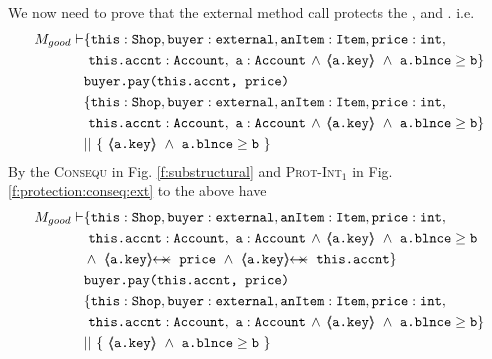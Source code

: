 \begin{proofO}
We now need to prove that the external method call  protects the , and . i.e.
\small
\begin{align*}
M_{good} \vdash 
		&\{  \prg{this}:\prg{Shop}, \prg{buyer} : \prg{external}, 
		\prg{anItem} : \prg{Item}, \prg{price} : \prg{int}, \\
		& \ \prg{this.accnt} : \prg{Account},\  \prg{a}:\prg{Account}\, \wedge\, {\inside{\prg{a.key}}}\ \wedge\ {\prg{a.blnce} \geq \prg{b}}\} \\
		  		& \prg{buyer.pay(this.accnt, price)}\ \\  
		&\{  \prg{this}:\prg{Shop}, \prg{buyer} : \prg{external}, 
		\prg{anItem} : \prg{Item}, \prg{price} : \prg{int}, \\
		& \ \prg{this.accnt} : \prg{Account},\  \prg{a}:\prg{Account}\, \wedge\, {\inside{\prg{a.key}}}\ \wedge\ {\prg{a.blnce} \geq \prg{b}}\} \\
		& ||\ \{\ {\inside{\prg{a.key}}\ \wedge\ 
							 {\prg{a.blnce} \geq \prg{b}}}\ \}
\end{align*}
\normalsize
By the \textsc{Consequ} in Fig. \ref{f:substructural} and \textsc{Prot-Int}$_1$ in Fig. \ref{f:protection:conseq:ext}  to the above have
\small
\begin{align*}
M_{good} \vdash 
		&\{  \prg{this}:\prg{Shop}, \prg{buyer} : \prg{external}, 
		\prg{anItem} : \prg{Item}, \prg{price} : \prg{int}, \\
		& \ \prg{this.accnt} : \prg{Account},\  \prg{a}:\prg{Account}\, \wedge\, 
			{\inside{\prg{a.key}}}\ \wedge\ {\prg{a.blnce} \geq \prg{b}}\ \\
		& \wedge\ \protectedFrom{\prg{a.key}}{\prg{price}}\ \wedge\ 
				   \protectedFrom{\prg{a.key}}{\prg{this.accnt}}\} \\
		  		& \prg{buyer.pay(this.accnt, price)}\ \\  
		&\{  \prg{this}:\prg{Shop}, \prg{buyer} : \prg{external}, 
		\prg{anItem} : \prg{Item}, \prg{price} : \prg{int}, \\
		& \ \prg{this.accnt} : \prg{Account},\  \prg{a}:\prg{Account}\, \wedge\, {\inside{\prg{a.key}}}\ \wedge\ {\prg{a.blnce} \geq \prg{b}}\} \\
		& ||\ \{\ {\inside{\prg{a.key}}\ \wedge\ 
							 {\prg{a.blnce} \geq \prg{b}}}\ \}
\end{align*}
\normalsize

\end{proofO}
